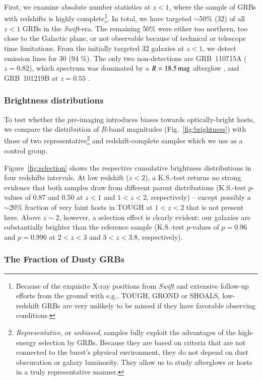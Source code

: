 \documentclass[traditabstract, longauth]{aa}
\begin{document}
{First, we examine absolute number statistics at $z<1$, where the sample of GRBs with redshifts is highly complete\footnote{Because of the exquisite X-ray positions from \textit{Swift} and extensive follow-up efforts from the ground with e.g., TOUGH, GROND or SHOALS, low-redshift GRBs are very unlikely to be missed if they have favorable observing conditions.}. In total, we have targeted $\sim$50\% (32) of all $z<1$ GRBs in the \textit{Swift}-era. The remaining 50\% were either too northern, too close to the Galactic plane, or not observable because of technical or telescope time limitations. From the initially targeted 32 galaxies at $z<1$, we detect emission lines for 30 (94 \%). The only two non-detections are GRB~110715A ($z=0.82$), which spectrum was dominated by a $R=18.5\,\rm{mag}$ afterglow \citep{2011GCN..12164...1P}, and GRB~101219B at $z=0.55$ \citep{2011ApJ...735L..24S}.}

\subsubsection{Brightness distributions}
\label{sec:bdist}

 {To test whether the pre-imaging introduces biases towards optically-bright hosts, we compare the distribution of $R$-band magnitudes (Fig.~\ref{fig:brightness}) with those of two representative\footnote{\textit{Representative}, or \textit{unbiased}, samples fully exploit the advantages of the high-energy selection by GRBs. Because they are based on criteria that are not connected to the burst's physical environment, they do not depend on dust obscuration or galaxy luminosity. They allow us to study afterglows or hosts in a truly representative manner.} and redshift-complete samples \citep{2012ApJ...756..187H, 2014arXiv1409.7064V} which we use as a control group.}
 
 {Figure~\ref{fig:selection} shows the respective cumulative brightness distributions in four redshifts intervals. At low redshift ($z<2$), a K.S.-test returns no strong evidence that both samples draw from different parent distributions (K.S.-test $p$-values of 0.87 and 0.50 at $z<1$ and $1<z<2$, respectively) -- except possibly a $\sim$20\% fraction of very faint hosts in TOUGH at $1<z<2$ that is not present here. Above $z \sim 2$, however, a selection effect is clearly evident: our galaxies are substantially brighter than the reference sample (K.S.-test $p$-values of $p=0.96$ and $p=0.996$ at $2<z<3$ and $3<z<3.8$, respectively).}

\subsubsection{The Fraction of Dusty GRBs}
\label{sec:dusty}
\end{document}
